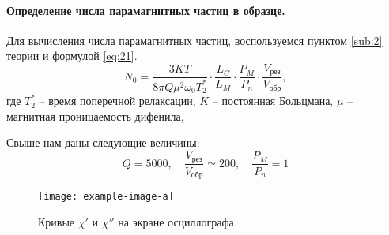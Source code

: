 \paragraph{Определение числа парамагнитных частиц в образце.}%
Для вычисления числа парамагнитных частиц, воспользуемся пунктом \ref{sub:2} теории и формулой \eqref{eq:21}.
\begin{equation}
    \label{eq:21a}
    N_0 = \frac{3KT}{8 \pi Q \mu^2 \omega_0 T^*_2} \cdot \frac{L_C}{L_M} \cdot \frac{P_M}{P_n} \cdot \frac{V_{\text{рез}}}{V_{\text{обр}}},
\end{equation}
где $T_2^*$ -- время поперечной релаксации,  $K$ -- постоянная Больцмана,  $\mu$ -- магнитная проницаемость дифенила,

Свыше нам даны следующие величины:
\begin{equation}
    \label{eq:}
    Q = 5000, \quad \frac{V_{\text{рез}}}{V_{\text{обр}}} \simeq 200, \quad \frac{P_M}{P_n} = 1
\end{equation}




\begin{figure}[h!]
    \centering
    \texttt{[image: example-image-a]}
    \caption{Кривые $\chi'$ и  $\chi''$ на экране осциллографа}
    \label{fig:3}
\end{figure}



